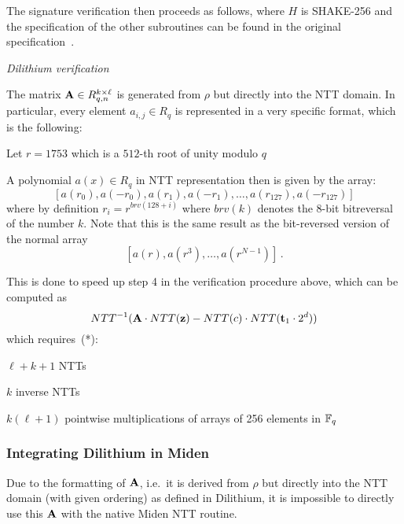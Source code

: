 The signature verification then proceeds as follows, where $H$ is SHAKE-256 and the specification
of the other subroutines can be found in the original specification~\cite{dilithium}.
\begin{algorithm}[!ht] \label{algo:dilithium_verify}
\begin{scriptsize}
\caption{\emph{Dilithium verification}}
\end{scriptsize}
\end{algorithm} 

The matrix $\mathbf{A} \in R_{q,n}^{k \times \ell}$ is generated from $\rho$ but directly into the NTT domain.
In particular, every element $a_{i,j} \in R_q$ is represented in a very specific format, which is the following:
\bit
\item Let $r = 1753$ which is a $512$-th root of unity modulo $q$
\item A polynomial $a(x) \in R_q$ in NTT representation then is given by the array:
\[ [a(r_0), a(-r_0), a(r_1), a(-r_1), \ldots, a(r_{127}), a(-r_{127})] \]
\eit
where by definition $r_i = r^{brv(128 + i)}$ where $brv(k)$ denotes the 8-bit bitreversal of the number $k$.
Note that this is the same result as the bit-reversed version of the normal array
\[  [a(r), a(r^3), \ldots, a(r^{N-1})] \, .  \]


This is done to speed up step 4 in the verification procedure above, which can be computed as 
\[ NTT^{-1} (  \mathbf{A} \cdot NTT(\mathbf{z})  - NTT(c) \cdot NTT(\mathbf{t}_1 \cdot 2^d))  \]
which requires~(*):
\bit
\item $\ell + k + 1$ NTTs
\item $k$ inverse NTTs
\item $k (\ell + 1)$ pointwise multiplications of arrays of 256 elements in $\mathbb{F}_q$
\eit

\subsubsection*{Integrating Dilithium in Miden} 
Due to the formatting of $\mathbf{A}$, i.e.\ it is derived from $\rho$ but directly into the NTT domain (with given ordering)
as defined in Dilithium, it is impossible to directly use this $\mathbf{A}$ with the native Miden NTT routine.

